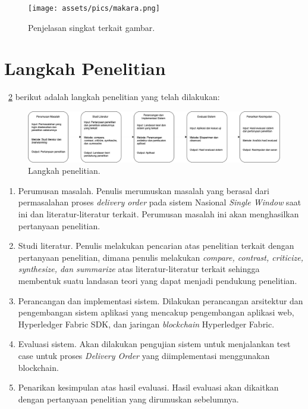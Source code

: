 \begin{figure}
	\centering
	\texttt{[image: assets/pics/makara.png]}
	\caption{Penjelasan singkat terkait gambar.}
	\label{fig:research_position}
\end{figure}



\section{Langkah Penelitian}
\label{sec:langkahPenelitian}
\pic~\ref{fig:metode} berikut adalah langkah penelitian yang telah dilakukan:

\begin{figure}
	\centering
	\includegraphics[width=\textwidth]{assets/pics/metode}
	\caption{Langkah penelitian.}
	\label{fig:metode}
\end{figure}

\begin{enumerate}
	\item Perumusan masalah. Penulis merumuskan masalah yang berasal dari permasalahan proses \textit{delivery order} pada sistem Nasional \textit{Single Window} saat ini dan literatur-literatur terkait. Perumusan masalah ini akan menghasilkan pertanyaan penelitian.
	\item Studi literatur. Penulis melakukan pencarian atas penelitian terkait dengan pertanyaan penelitian, dimana penulis melakukan \textit{compare, contrast, criticize, synthesize, dan summarize} atas literatur-literatur terkait sehingga membentuk suatu landasan teori yang dapat menjadi pendukung penelitian.
	\item Perancangan dan implementasi sistem. Dilakukan perancangan arsitektur dan pengembangan sistem aplikasi yang mencakup pengembangan aplikasi web, Hyperledger Fabric SDK, dan jaringan \textit{blockchain} Hyperledger Fabric.
	\item Evaluasi sistem. Akan dilakukan pengujian sistem untuk menjalankan test case untuk proses \textit{Delivery Order} yang diimplementasi menggunakan blockchain.
	\item Penarikan kesimpulan atas hasil evaluasi. Hasil evaluasi akan dikaitkan dengan pertanyaan penelitian yang dirumuskan sebelumnya.

\end{enumerate}


